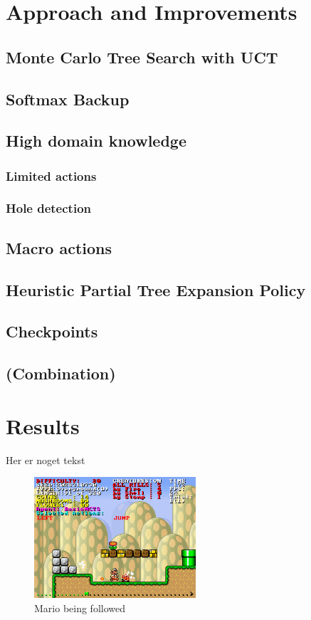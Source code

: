 \documentclass[10pt,a4paper,twoside]{article}
\begin{document}
\section{Approach and Improvements}

\subsection{Monte Carlo Tree Search with UCT}
\cite{mctssurvey}
\subsection{Softmax Backup}
\subsection{High domain knowledge}
\subsubsection{Limited actions}
\subsubsection{Hole detection}
\subsection{Macro actions}
\cite{salesman}
\subsection{Heuristic Partial Tree Expansion Policy}
\subsection{Checkpoints}

\subsection{(Combination)}

\section{Results}
Her er noget tekst

\begin{figure}[h] %
\centering
\includegraphics[width=6cm]{img/Forfulgt}
\caption{Mario being followed}
\label{fig:followed}
\end{figure}
\end{document}
